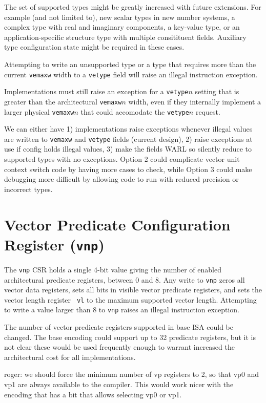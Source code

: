 \begin{commentary}
  The set of supported types might be greatly increased with future
  extensions.  For example (and not limited to), new scalar types in
  new number systems, a complex type with real and imaginary
  components, a key-value type, or an application-specific structure
  type with multiple consitituent fields.  Auxiliary type
  configuration state might be required in these cases.
\end{commentary}

Attempting to write an unsupported type or a type that requires more
than the current {\tt vemaxw} width to a {\tt vetype} field will raise
an illegal instruction exception.

\begin{commentary}
Implementations must still raise an exception for a {\tt vetype}$n$
setting that is greater than the architectural {\tt vemaxw}$n$ width,
even if they internally implement a larger physical {\tt vemaxw}$n$
that could accomodate the {\tt vetype}$n$ request.
\end{commentary}

\begin{discussion}
We can either have 1) implementations raise exceptions whenever
illegal values are written to {\tt vemaxw} and {\tt vetype} fields
(current design), 2) raise exceptions at use if config holds illegal
values, 3) make the fields WARL so silently reduce to supported types
with no exceptions.  Option 2 could complicate vector unit context
switch code by having more cases to check, while Option 3 could make
debugging more difficult by allowing code to run with reduced
precision or incorrect types.
\end{discussion}

\section{Vector Predicate Configuration Register ({\tt vnp})}

The {\tt vnp} CSR holds a single 4-bit value giving the number of
enabled architectural predicate registers, between 0 and 8.  Any write
to {\tt vnp} zeros all vector data registers, sets all bits in visible
vector predicate registers, and sets the vector length register {\tt
  vl} to the maximum supported vector length.  Attempting to write a
value larger than 8 to {\tt vnp} raises an illegal instruction
exception.

\begin{discussion}
The number of vector predicate registers supported in
  base ISA could be changed.  The base encoding could support up to 32
  predicate registers, but it is not clear these would be used
  frequently enough to warrant increased the architectural cost for
  all implementations.
  
  roger: we should force the minimum number of vp registers to 2, so that vp0
   and vp1 are always available to the compiler. This would work nicer with
   the encoding that has a bit that allows selecting vp0 or vp1.
\end{discussion}

